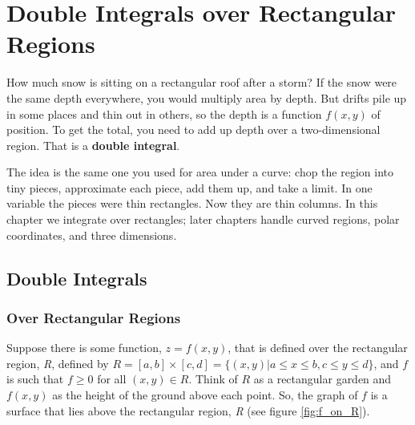 \chapter{Double Integrals over Rectangular Regions}

How much snow is sitting on a rectangular roof after a storm? If the snow were
the same depth everywhere, you would multiply area by depth. But drifts pile up
in some places and thin out in others, so the depth is a function $f(x,y)$ of
position. To get the total, you need to add up depth over a two-dimensional
region. That is a \textbf{double integral}.

The idea is the same one you used for area under a curve: chop the region into
tiny pieces, approximate each piece, add them up, and take a limit. In one
variable the pieces were thin rectangles. Now they are thin columns. In this
chapter we integrate over rectangles; later chapters handle curved regions,
polar coordinates, and three dimensions.

\section{Double Integrals}
\subsection{Over Rectangular Regions}
Suppose there is some function, $z = f(x,y)$, that is defined over the 
rectangular region, \textit{R}, defined by $\textit{R} = [a, b] \times [c,d] = 
\{(x,y)| a \leq x \leq b, c \leq y \leq d\}$, and $f$ is such that $f \geq 0$ 
for all $(x, y) \in R$. Think of $R$ as a rectangular garden and $f(x,y)$ as the height of the ground above each point. So, the graph of $f$ is a surface that lies 
above the rectangular region, \textit{R} (see figure \ref{fig:f_on_R}). 

